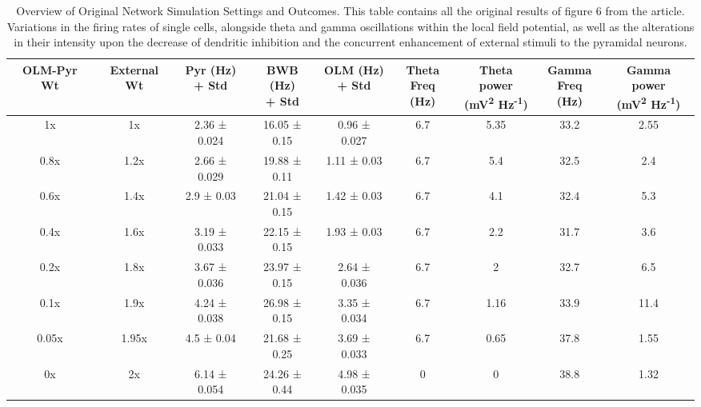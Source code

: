 \begin{table}[htbp]
    \centering
    \caption[Summary of Original Network Simulation Parameters and Results]{Overview of Original Network Simulation Settings and Outcomes.
        This table contains all the original results of figure 6 from the \textcite{sanjayImpairedDendriticInhibition2015} article.
        Variations in the firing rates of single cells, alongside theta and gamma oscillations within the local field potential, as well as the alterations in their intensity upon the decrease of dendritic inhibition and the concurrent enhancement of external stimuli to the pyramidal neurons.}\label{tab:original_validation_results}
    \begin{adjustbox}{width=\textwidth}
        \begin{tabular}{ccccccccc}
            \hline
            OLM-Pyr Wt & External Wt & \CellWithForcedBreak{Pyr (Hz)                                                          \\ + Std} & \CellWithForcedBreak{BWB (Hz) \\ + Std} & \CellWithForcedBreak{OLM (Hz) \\ + Std} & \CellWithForcedBreak{Theta \\ Freq (Hz)} & \CellWithForcedBreak{Theta power \\ (mV\textsuperscript{2} Hz\textsuperscript{-1})} & \CellWithForcedBreak{Gamma \\ Freq (Hz)} & \CellWithForcedBreak{Gamma power \\ (mV\textsuperscript{2} Hz\textsuperscript{-1})} \\
            \hline
            1x         & 1x          & 2.36 ± 0.024                  & 16.05 ± 0.15 & 0.96 ± 0.027 & 6.7 & 5.35 & 33.2 & 2.55 \\
            0.8x       & 1.2x        & 2.66 ± 0.029                  & 19.88 ± 0.11 & 1.11 ± 0.03  & 6.7 & 5.4  & 32.5 & 2.4  \\
            0.6x       & 1.4x        & 2.9 ± 0.03                    & 21.04 ± 0.15 & 1.42 ± 0.03  & 6.7 & 4.1  & 32.4 & 5.3  \\
            0.4x       & 1.6x        & 3.19 ± 0.033                  & 22.15 ± 0.15 & 1.93 ± 0.03  & 6.7 & 2.2  & 31.7 & 3.6  \\
            0.2x       & 1.8x        & 3.67 ± 0.036                  & 23.97 ± 0.15 & 2.64 ± 0.036 & 6.7 & 2    & 32.7 & 6.5  \\
            0.1x       & 1.9x        & 4.24 ± 0.038                  & 26.98 ± 0.15 & 3.35 ± 0.034 & 6.7 & 1.16 & 33.9 & 11.4 \\
            0.05x      & 1.95x       & 4.5 ± 0.04                    & 21.68 ± 0.25 & 3.69 ± 0.033 & 6.7 & 0.65 & 37.8 & 1.55 \\
            0x         & 2x          & 6.14 ± 0.054                  & 24.26 ± 0.44 & 4.98 ± 0.035 & 0   & 0    & 38.8 & 1.32 \\
            \hline
        \end{tabular}
    \end{adjustbox}
\end{table}

